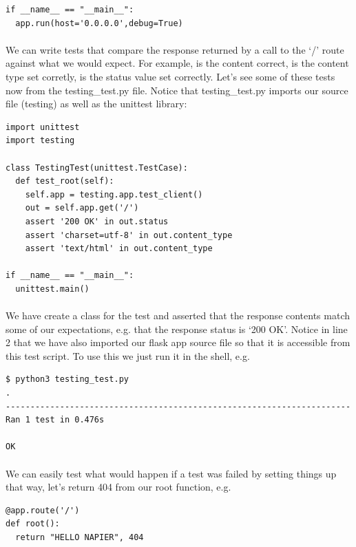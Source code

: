 \documentclass[12pt, a4paper, oneside]{book}
\begin{document}
{\begin{lstlisting}
if __name__ == "__main__":
  app.run(host='0.0.0.0',debug=True)
\end{lstlisting}

\paragraph{} We can write tests that compare the response returned by a call to the `/' route against what we would expect. For example, is the content correct, is the content type set corretly, is the status value set correctly. Let's see some of these tests now from the testing\_test.py file. Notice that testing\_test.py imports our source file (testing) as well as the unittest library:

\begin{lstlisting}
import unittest
import testing

class TestingTest(unittest.TestCase):
  def test_root(self):
    self.app = testing.app.test_client()
    out = self.app.get('/')
    assert '200 OK' in out.status
    assert 'charset=utf-8' in out.content_type
    assert 'text/html' in out.content_type

if __name__ == "__main__":
  unittest.main()
\end{lstlisting}

\paragraph{} We have create a class for the test and asserted that the response contents match some of our expectations, e.g. that the response status is `200 OK'. Notice in line 2 that we have also imported our flask app source file so that it is accessible from this test script. To use this we just run it in the shell, e.g.

\begin{lstlisting}[style=DOS]
$ python3 testing_test.py 
.
----------------------------------------------------------------------
Ran 1 test in 0.476s

OK
\end{lstlisting}
\paragraph{} We can easily test what would happen if a test was failed by setting things up that way, let's return 404 from our root function, e.g.

\begin{lstlisting}
@app.route('/')
def root():
  return "HELLO NAPIER", 404
\end{lstlisting}

}
\end{document}
